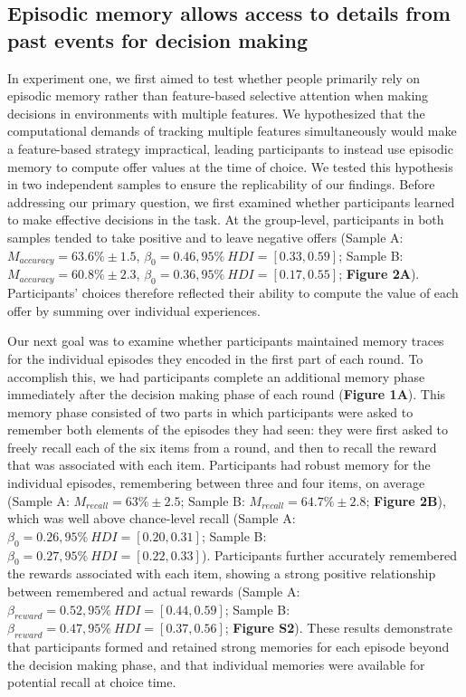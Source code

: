\documentclass[10pt,letterpaper]{article}
\begin{document}
\subsection{Episodic memory allows access to details from past events for decision making}

In experiment one, we first aimed to test whether people primarily rely on episodic memory rather than feature-based selective attention when making decisions in environments with multiple features. We hypothesized that the computational demands of tracking multiple features simultaneously would make a feature-based strategy impractical, leading participants to instead use episodic memory to compute offer values at the time of choice. We tested this hypothesis in two independent samples to ensure the replicability of our findings. Before addressing our primary question, we first examined whether participants learned to make effective decisions in the task. At the group-level, participants in both samples tended to take positive and to leave negative offers (Sample A: $M_{accuracy} = 63.6\% \pm 1.5$, $\beta_{0} = 0.46, 95\% \ HDI = [0.33, 0.59]$; Sample B: $M_{accuracy} = 60.8\% \pm 2.3$, $\beta_{0} = 0.36, 95\% \ HDI = [0.17, 0.55]$; \textbf{Figure 2A}). Participants' choices therefore reflected their ability to compute the value of each offer by summing over individual experiences.

Our next goal was to examine whether participants maintained memory traces for the individual episodes they encoded in the first part of each round. To accomplish this, we had participants complete an additional memory phase immediately after the decision making phase of each round (\textbf{Figure 1A}). This memory phase consisted of two parts in which participants were asked to remember both elements of the episodes they had seen: they were first asked to freely recall each of the six items from a round, and then to recall the reward that was associated with each item. Participants had robust memory for the individual episodes, remembering between three and four items, on average (Sample A: $M_{recall} = 63\% \pm 2.5$; Sample B: $M_{recall} = 64.7\% \pm 2.8$; \textbf{Figure 2B}), which was well above chance-level recall (Sample A: $\beta_{0} = 0.26, 95\% \ HDI = [0.20, 0.31]$; Sample B: $\beta_{0} = 0.27, 95\% \ HDI = [0.22, 0.33]$). Participants further accurately remembered the rewards associated with each item, showing a strong positive relationship between remembered and actual rewards (Sample A: $\beta_{reward} = 0.52, 95\% \ HDI = [0.44, 0.59]$; Sample B: $\beta_{reward} = 0.47, 95\% \ HDI = [0.37, 0.56]$; \textbf{Figure S2}). These results demonstrate that participants formed and retained strong memories for each episode beyond the decision making phase, and that individual memories were available for potential recall at choice time.
\end{document}
